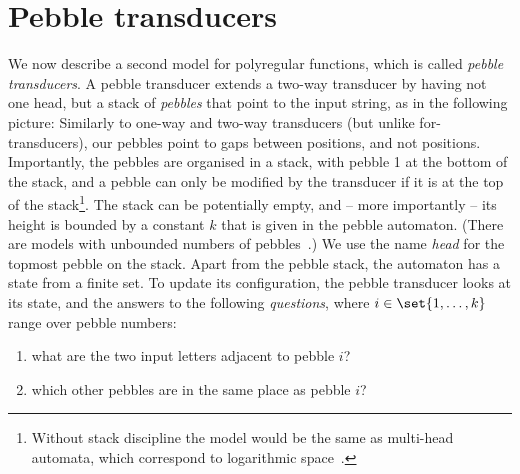 \section{Pebble transducers}
\label{sec:polyregular-pebble}
We now describe a second model for polyregular functions, which is called \emph{pebble transducers}. 
A pebble transducer extends a two-way transducer by having not one head, but a stack of  \emph{pebbles} that point to the input string, as in the following picture:
Similarly to one-way and  two-way transducers (but unlike for-transducers), our pebbles point to gaps between positions, and not positions. 
Importantly, the pebbles are organised in a stack, with pebble 1 at the bottom of the stack, and a  pebble can only be modified by the transducer if it is at the top of the stack\footnote{
    \label{footnote:stack-discipline}
    Without  stack discipline the model would be the same as multi-head automata, which correspond to logarithmic space~\cite[Corollary 3.5]{ibarra1971}.}.
The stack can be potentially empty, and -- more importantly -- its height is bounded by a constant $k$ that is given in the pebble automaton. (There are models with unbounded numbers of pebbles~\cite{engelfriet2007}.)
We use the name \emph{head} for the topmost pebble on the stack. Apart from the pebble stack, the automaton has a state from a finite set. To update its configuration, the pebble transducer looks at its state, and the answers to the  following \emph{questions}, where $i \in \set{1,\ldots,k}$ range over pebble numbers:
\begin{enumerate}
    \item \label{pebble-question:label} what are the two input letters adjacent to pebble $i$?
    \item \label{pebble-question:left} which other pebbles are in the same place as pebble $i$?
\end{enumerate}

